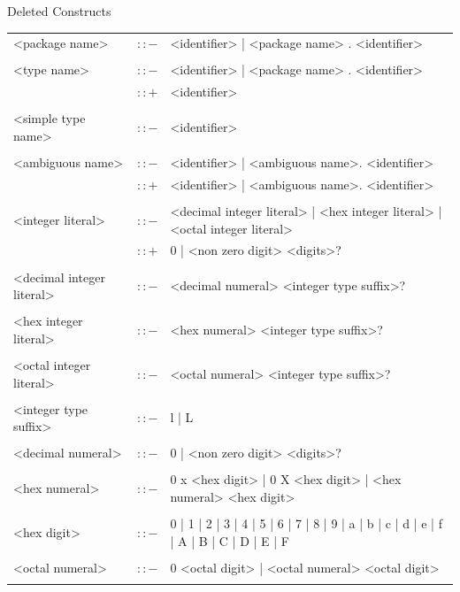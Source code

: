 \documentclass[landscape, 11pt]{article}
\begin{document}
\begin{qsection}{Deleted Constructs}
\begin{enumerate}[label=\bt{\theenumi.}]
		\ditem[Tokens.]
			\begin{longtable}{R{7cm} c L{15cm}}
				<package name>								&	$\colon\colon-$	&	<identifier> | <package name> . <identifier> \\\\
				<type name>									&	$\colon\colon-$	&	<identifier> | <package name> . <identifier> \\
															&	$\colon\colon+$	&	<identifier> \\\\
				<simple type name>							&	$\colon\colon-$	&	<identifier> \\\\
				<ambiguous name>							&	$\colon\colon-$	&	<identifier> | <ambiguous name>. <identifier> \\
															&	$\colon\colon+$	&	<identifier> | <ambiguous name>. <identifier> \\\\
				<integer literal>							&	$\colon\colon-$	&	<decimal integer literal> | <hex integer literal> | <octal integer literal> \\
															&	$\colon\colon+$	&	0 | <non zero digit> <digits>? \\\\
				<decimal integer literal>					&	$\colon\colon-$	&	<decimal numeral> <integer type suffix>? \\\\
				<hex integer literal>						&	$\colon\colon-$	&	<hex numeral> <integer type suffix>? \\\\
				<octal integer literal>						&	$\colon\colon-$	&	<octal numeral> <integer type suffix>? \\\\
				<integer type suffix>						&	$\colon\colon-$	&	l | L \\\\
				<decimal numeral>							&	$\colon\colon-$	&	0 | <non zero digit> <digits>? \\\\
				<hex numeral>								&	$\colon\colon-$	&	0 x <hex digit> | 0 X <hex digit> | <hex numeral> <hex digit> \\\\
				<hex digit>									&	$\colon\colon-$	&	0 | 1 | 2 | 3 | 4 | 5 | 6 | 7 | 8 | 9 | a | b | c | d | e | f | A | B | C | D | E | F \\\\
				<octal numeral>								&	$\colon\colon-$	&	0 <octal digit> | <octal numeral> <octal digit> \\\\

\end{longtable}
\end{enumerate}
\end{qsection}
\end{document}

